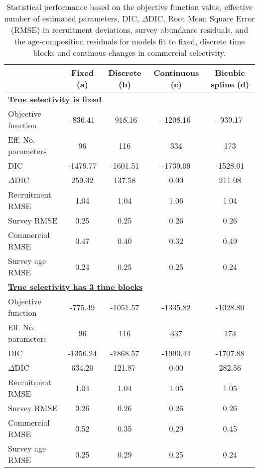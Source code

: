 \begin{table}[!tbh]
	\caption{Statistical performance based on the objective function value, effective number of estimated parameters, DIC, $\Delta$DIC, Root Mean Square Error (RMSE) in recruitment deviations, survey abundance residuals, and the age-composition residuals for models fit to fixed, discrete time blocks and continous changes in commercial selectivity.}
	\label{tab:statisticalPeformance}
	\begin{center}
		\begin{tabular}{l|cccc}
		\hline

		\hline
		\textbf{} & \textbf{Fixed (a)} & \textbf{Discrete (b)} & \textbf{Continuous (c)} & \textbf{Bicubic spline (d)} \\
		\hline

		
	    \multicolumn{5}{l}{\textbf{\underline{True selectivity is fixed}}}\\
		Objective function            &  -836.41 &  -918.16 & -1208.16 &  -939.17 \\
		Eff. No. parameters             &    96 &   116 &   334 &   173 \\
		DIC              & -1479.77 & -1601.51 & -1739.09 & -1528.01 \\
		$\Delta$DIC         &   259.32 &   137.58 &     0.00 &   211.08 \\
		Recruitment RMSE &     1.04 &     1.04 &     1.06 &     1.04 \\
		Survey RMSE      &     0.25 &     0.25 &     0.26 &     0.26 \\
		Commercial RMSE         &     0.47 &     0.40 &     0.32 &     0.49 \\
		Survey age RMSE         &     0.24 &     0.25 &     0.25 &     0.24 \\
		
		\hline
		\multicolumn{5}{l}{\textbf{\underline{True selectivity has 3 time blocks}}}\\
		Objective function            &  -775.49 & -1051.57 & -1335.82 & -1028.80 \\
		Eff. No. parameters             &    96 &   116 &   337 &   173 \\
		DIC              & -1356.24 & -1868.57 & -1990.44 & -1707.88 \\
		$\Delta$DIC         &   634.20 &   121.87 &     0.00 &   282.56 \\
		Recruitment RMSE &     1.04 &     1.04 &     1.05 &     1.05 \\
		Survey RMSE      &     0.26 &     0.26 &     0.26 &     0.26 \\
		Commercial RMSE         &     0.52 &     0.35 &     0.29 &     0.45 \\
		Survey age RMSE         &     0.25 &     0.29 &     0.25 &     0.24 \\


\end{tabular}
\end{center}
\end{table}
